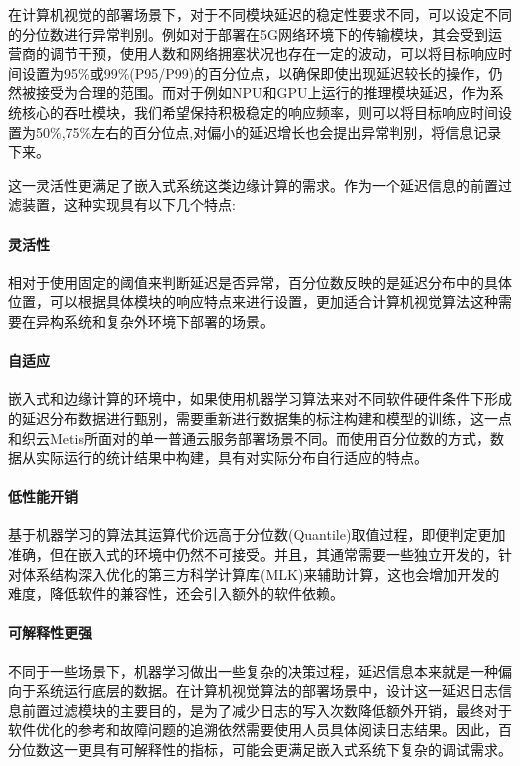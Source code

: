 \documentclass[master,anonymous]{shtthesis}
\begin{document}
在计算机视觉的部署场景下，对于不同模块延迟的稳定性要求不同，可以设定不同的分位数进行异常判别。例如对于部署在5G网络环境下的传输模块，其会受到运营商的调节干预，使用人数和网络拥塞状况也存在一定的波动，可以将目标响应时间设置为95$\%$或99$\%$(P95/P99)的百分位点，以确保即使出现延迟较长的操作，仍然被接受为合理的范围。而对于例如NPU和GPU上运行的推理模块延迟，作为系统核心的吞吐模块，我们希望保持积极稳定的响应频率，则可以将目标响应时间设置为50$\%$,75$\%$左右的百分位点,对偏小的延迟增长也会提出异常判别，将信息记录下来。

这一灵活性更满足了嵌入式系统这类边缘计算的需求。作为一个延迟信息的前置过滤装置，这种实现具有以下几个特点:

\paragraph{灵活性}
相对于使用固定的阈值来判断延迟是否异常，百分位数反映的是延迟分布中的具体位置，可以根据具体模块的响应特点来进行设置，更加适合计算机视觉算法这种需要在异构系统和复杂外环境下部署的场景。

\paragraph{自适应}
嵌入式和边缘计算的环境中，如果使用机器学习算法来对不同软件硬件条件下形成的延迟分布数据进行甄别\cite{zhang2016treadmill}，需要重新进行数据集的标注构建和模型的训练，这一点和织云Metis所面对的单一普通云服务部署场景不同。而使用百分位数的方式，数据从实际运行的统计结果中构建，具有对实际分布自行适应的特点。

\paragraph{低性能开销}
基于机器学习的算法其运算代价远高于分位数(Quantile)取值过程，即便判定更加准确，但在嵌入式的环境中仍然不可接受。并且，其通常需要一些独立开发的，针对体系结构深入优化的第三方科学计算库(MLK)来辅助计算，这也会增加开发的难度，降低软件的兼容性，还会引入额外的软件依赖。

\paragraph{可解释性更强}
不同于一些场景下，机器学习做出一些复杂的决策过程，延迟信息本来就是一种偏向于系统运行底层的数据。在计算机视觉算法的部署场景中，设计这一延迟日志信息前置过滤模块的主要目的，是为了减少日志的写入次数降低额外开销，最终对于软件优化的参考和故障问题的追溯依然需要使用人员具体阅读日志结果。因此，百分位数这一更具有可解释性的指标，可能会更满足嵌入式系统下复杂的调试需求。
\end{document}
